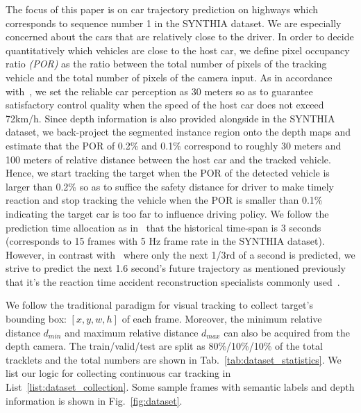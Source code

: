 \documentclass[10pt,twocolumn,letterpaper]{article}
\begin{document}
The focus of this paper is on car trajectory prediction on highways which corresponds to sequence number 1 in the SYNTHIA dataset. We are especially concerned about the cars that are relatively close to the driver.
In order to decide quantitatively which vehicles are close to the host car, we define pixel occupancy ratio \emph{(POR)} as the ratio between the total number of pixels of the tracking vehicle and the total number of pixels of the camera input.
As in accordance with~\cite{chen2015deepdriving}, we set the reliable car perception as 30 meters so as to guarantee satisfactory control quality when the speed of the host car does not exceed 72km/h.
Since depth information is also provided alongside in the SYNTHIA dataset, we back-project the segmented instance region onto the depth maps and estimate that the POR of 0.2\% and 0.1\% correspond to roughly 30 meters and 100 meters of relative distance between the host car and the tracked vehicle.
Hence, we start tracking the target when the POR of the detected vehicle is larger than 0.2\%  so as to suffice the safety distance for driver to make timely reaction and stop tracking the vehicle when the POR is smaller than 0.1\% indicating the target car is too far to influence driving policy.
We follow the prediction time allocation as in~\cite{xu2017end} that the historical time-span is 3 seconds (corresponds to 15 frames with 5 Hz frame rate in the SYNTHIA dataset).
However, in contrast with~\cite{xu2017end} where only the next 1/3rd of a second is predicted, we strive to predict the next 1.6 second's future trajectory as mentioned previously that it's the reaction time accident reconstruction specialists commonly used~\cite{mcgehee2000driver}.

We follow the traditional paradigm for visual tracking to collect target's bounding box: $[x, y, w, h]$ of each frame. Moreover, the minimum relative distance $d_{min}$ and maximum relative distance $d_{max}$ can also be acquired from the depth camera. The train/valid/test are split as 80\%/10\%/10\% of the total tracklets and the total numbers are shown in Tab.~\ref{tab:dataset_statistics}.
We list our logic for collecting continuous car tracking in List~\ref{list:dataset_collection}.
Some sample frames with semantic labels and depth information is shown in Fig.~\ref{fig:dataset}.



\end{document}
